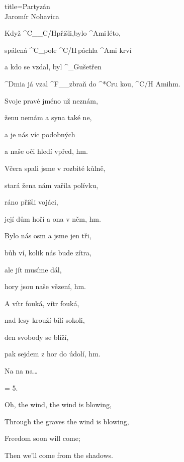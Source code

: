 \begin{song}{title=\predtitle\centering Partyzán  \\\large Jaromír Nohavica  \vspace*{-0.3cm}}  %
\begin{centerjustified}

\sloka 
	Když ^{C{\color{white}\_\_}C/H}přišli,\:bylo ^{Ami\,}léto,
	
	spálená ^{C{\color{white}\_}}pole ^{C/H{\color{white}\,\:}}páchla ^{Ami\,\,}krví
	
	a kdo se vzdal, byl ^{{\color{white}\_}G}ušetřen
	
	^{Dmi}a já vzal ^{F{\color{white}\_\_}}zbraň do ^*{C}ru kou, ^{C/H Ami}hm.\:\:\:\:\:\:\:\:\:\:\:\:
	
\sloka
	Svoje pravé jméno už neznám,
	
	ženu nemám a syna také ne,
	
	a je nás víc podobných
	
	a naše oči hledí vpřed, hm.

\sloka
	Včera spali jsme v rozbité kůlně,
	
	 stará žena nám vařila polívku,
	
	ráno přišli vojáci,
	
	její dům hoří a ona v něm, hm.

\sloka
	Bylo nás osm a jsme jen tři,
	
	bůh ví, kolik nás bude zítra,
	
	ale jít musíme dál,
	
	hory jsou naše vězení, hm.
	
\sloka
	A vítr fouká, vítr fouká,
	
	nad lesy krouží bílí sokoli,
	
	den svobody se blíží,
	
	pak sejdem z hor do údolí, hm.

\sloka
Na na na\elipsa\dots

\sloka = 5. 

\phantom{.}

Oh, the wind, the wind is blowing,

Through the graves the wind is blowing,

Freedom soon will come;

Then we'll come from the shadows.

\end{centerjustified}
\setcounter{Slokočet}{0}
\end{song}

